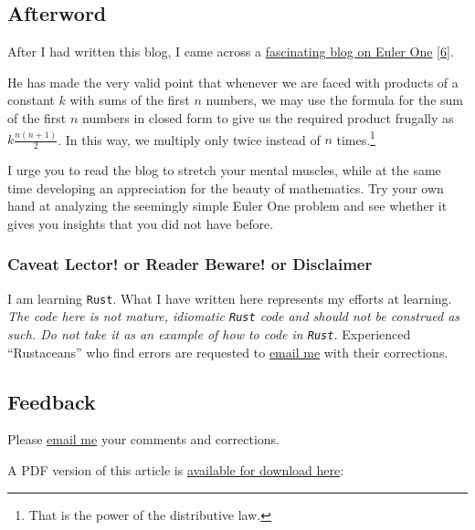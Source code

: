\documentclass[
  a4paper,
]{article}
\begin{document}
\hypertarget{afterword}{%
\subsection{Afterword}\label{afterword}}

After I had written this blog, I came across a
\href{https://iambryanhaney.medium.com/another-unreasonable-deep-dive-into-project-euler-problem-1-51a3a841ad67\#:~:text=The\%20Problem,0\%20modulo\%203\%20or\%205}{fascinating
blog on Euler One} {[}\protect\hyperlink{ref-haney2020}{6}{]}.

He has made the very valid point that whenever we are faced with
products of a constant \(k\) with sums of the first \(n\) numbers, we
may use the formula for the sum of the first \(n\) numbers in closed
form to give us the required product frugally as
\(k\frac{n(n + 1)}{2}\). In this way, we multiply only twice instead of
\(n\) times.\footnote{That is the power of the distributive law.}

I urge you to read the blog to stretch your mental muscles, while at the
same time developing an appreciation for the beauty of mathematics. Try
your own hand at analyzing the seemingly simple Euler One problem and
see whether it gives you insights that you did not have before.

\hypertarget{caveat-lector-or-reader-beware-or-disclaimer}{%
\subsubsection{Caveat Lector! or Reader Beware! or
Disclaimer}\label{caveat-lector-or-reader-beware-or-disclaimer}}

I am learning \texttt{Rust}. What I have written here represents my
efforts at learning. \emph{The code here is not mature, idiomatic
\texttt{Rust} code and should not be construed as such. Do not take it
as an example of how to code in \texttt{Rust}.} Experienced
``Rustaceans'' who find errors are requested to
\href{mailto:feedback.swanlotus@gmail.com}{email me} with their
corrections. \normalfont

\hypertarget{feedback}{%
\subsection{Feedback}\label{feedback}}

Please \href{mailto:feedback.swanlotus@gmail.com}{email me} your
comments and corrections.

\noindent A PDF version of this article is
\href{./rust-euler-one.pdf}{available for download here}:
\end{document}
